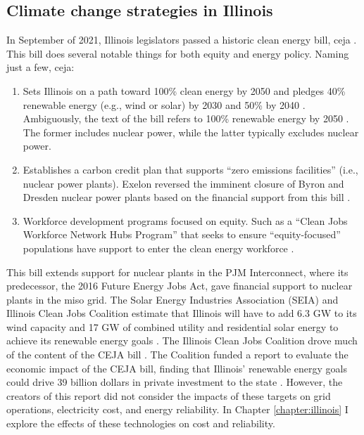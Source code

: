 \subsection{Climate change strategies in Illinois}
\label{section:ceja}
In September of 2021, Illinois legislators passed a historic clean energy bill,
\gls{ceja} \cite{harmon_climate_2021}. This bill does several notable things for
both equity and energy policy. Naming just a few, \gls{ceja}:
\begin{enumerate}
  \item Sets Illinois on a path toward 100\% clean energy by 2050 and pledges 40\% renewable
  energy (e.g., wind or solar) by 2030 and 50\% by 2040
  \cite{office_of_governor_jb_pritzker_gov_2021}. Ambiguously,
  the text of the bill refers to 100\% renewable energy by 2050 \cite{harmon_climate_2021}.
  The former includes nuclear power, while the latter typically excludes nuclear power.
  \item Establishes a carbon credit plan that supports “zero emissions facilities”
  (i.e., nuclear power plants). Exelon reversed the imminent closure of Byron and
  Dresden nuclear power plants based on the financial support from this bill
  \cite{brown_two_2021}.
  \item Workforce development programs focused on equity. Such as a
  “Clean Jobs Workforce Network Hubs Program” that seeks to ensure “equity-focused”
  populations have support to enter the clean energy workforce
  \cite{office_of_governor_jb_pritzker_gov_2021}.
\end{enumerate}
This bill extends support for nuclear plants in the PJM Interconnect, where its
predecessor, the 2016 Future Energy Jobs Act, gave financial support to nuclear
plants in the \gls{miso} grid. The Solar Energy Industries Association (SEIA) and Illinois
Clean Jobs Coalition estimate that Illinois will have to add 6.3 GW to its wind capacity
and 17 GW of combined utility and residential solar energy
to achieve its renewable energy goals \cite{goeller_new_2021, the_accelerate_group_clean_2019}.
The Illinois Clean Jobs Coalition drove much of the content of the CEJA bill
\cite{the_accelerate_group_clean_2019}.
The Coalition funded a report to evaluate the economic impact of the CEJA bill,
finding that Illinois’ renewable energy goals could drive 39 billion dollars in
private investment to the state \cite{the_accelerate_group_clean_2019}.
However, the creators of this report did not consider the impacts of these targets
on grid operations, electricity cost, and energy reliability. In Chapter
\ref{chapter:illinois} I explore the effects of these technologies on cost and
reliability.


